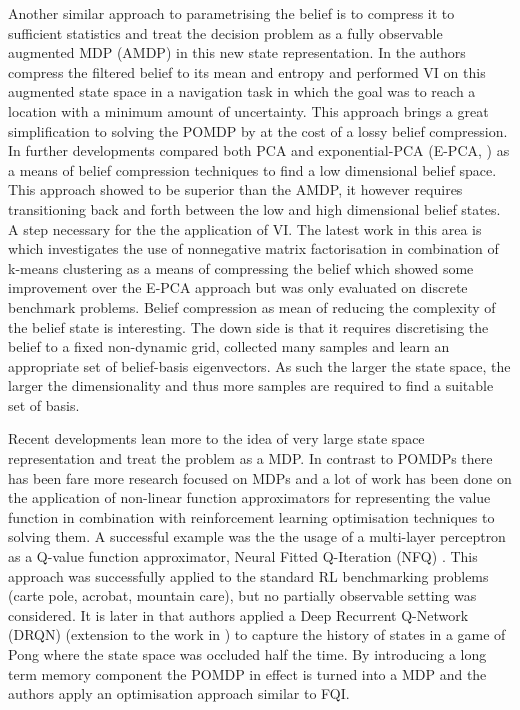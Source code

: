 Another similar approach to parametrising the belief is to compress it to sufficient statistics and treat 
the decision problem as a fully observable augmented MDP (AMDP) in this new state representation. In \cite{Roy99coastalnavigation}
the authors compress the filtered belief to its mean and entropy and performed VI on this augmented state space
in a navigation task in which the goal was to reach a location with a minimum amount of uncertainty. This approach
brings a great simplification to solving the POMDP by at the cost of a lossy belief compression. In further developments
\cite{belief_compression_2005} compared both PCA and exponential-PCA (E-PCA, \cite{EPCA_2003}) as a means of belief compression techniques to find a low
dimensional belief space. This approach showed to be superior than the AMDP, it however requires transitioning back and forth 
between the low and high dimensional belief states. A step necessary for the the application of VI. The latest work in this 
area is \cite{bs_compression_2010} which investigates the use of nonnegative matrix factorisation in combination of k-means 
clustering as a means of compressing the belief which showed some improvement over the E-PCA approach but was only evaluated 
on discrete benchmark problems. Belief compression as mean of reducing the complexity of the belief state is interesting. The 
down side is that it requires discretising the belief to a fixed non-dynamic grid, collected many samples and learn an 
appropriate set of belief-basis eigenvectors. As such the larger the state space, the larger the dimensionality and thus more
samples are required to find a suitable set of basis.

Recent developments lean more to the idea of very large state space representation and treat the problem as a MDP. In contrast to 
POMDPs there has been fare more research focused on MDPs and a lot of work has been done on the application of non-linear function 
approximators for representing the value function in combination with reinforcement learning optimisation techniques to solving them.
A successful example was the the usage of a multi-layer perceptron as a Q-value function approximator, Neural Fitted Q-Iteration (NFQ) \cite{neura_fqi_2005}.
This approach was successfully applied to the standard RL benchmarking problems (carte pole, acrobat, mountain care), but no partially observable
setting was considered. It is later in \cite{DRQ_AAAI_2015} that authors applied a Deep Recurrent Q-Network (DRQN) (extension to the work in \cite{mnih-dqn-2015})
to capture the history of states in a game of Pong where the state space was occluded half the time. By introducing a long term memory component 
the POMDP in effect is turned into a MDP and the authors apply an optimisation approach similar to FQI. 


